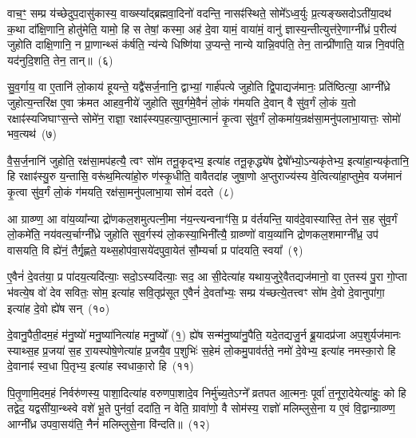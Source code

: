 वाच॒ꣳ॒ सम्प्र य॑च्छेदुप॒दासु॑कास्य॒ वाख्स्या᳚द्ब्रह्मवा॒दिनो॑ वदन्ति॒ नासꣴ॑स्थिते॒ सोमे᳚\-ऽध्व॒र्युः प्र॒त्यङ्ख्सदो\-ऽती॑या॒दथ॑ क॒था दा᳚क्षि॒णानि॒ होतु॑मेति॒ यामो॒ हि स तेषां॒ कस्मा॒ अह॑ दे॒वा यामं॒ वाया॑मं॒ वानु॑ ज्ञास्य॒न्तीत्युत्त॑रे॒णाग्नी᳚ध्रं प॒रीत्य॑ जुहोति दाक्षि॒णानि॒ न प्रा॒णान्थ्सं क॑र्\mbox{}षति॒ न्य॑न्ये धिष्णि॑या उ॒प्यन्ते॒ नान्ये यान्नि॒वप॑ति॒ तेन॒ तान्प्री॑णाति॒ यान्न नि॒वप॑ति॒ यद॑नुदि॒शति॒ तेन॒ तान्॥~(६)\ip

{\anuvakamend[{स्तु॒ते वि॒न्दते॒ हि वी॑यन्ते प्र॒तीची॑रुद्गा॒त्र उ॒प्यन्ते॒ चतु॑र्दश च}]}

सु॒व॒र्गाय॒ वा ए॒तानि॑ लो॒काय॑ हूयन्ते॒ यद्वै॑सर्ज॒नानि॒ द्वाभ्यां॒ गार्\mbox{}ह॑पत्ये जुहोति द्वि॒पाद्यज॑मानः॒ प्रति॑ष्ठित्या॒ आग्नी᳚ध्रे जुहोत्य॒न्तरि॑क्ष ए॒वा क्र॑मत आहव॒नीये॑ जुहोति सुव॒र्गमे॒वैनं॑ लो॒कं ग॑मयति दे॒वान् वै सु॑व॒र्गं लो॒कं य॒तो रक्षाꣴ॑स्यजिघाꣳस॒न्ते सोमे॑न॒ राज्ञा॒ रक्षाꣴ॑स्यप॒हत्या॒प्तुमा॒त्मानं॑ कृ॒त्वा सु॑व॒र्गं लो॒कमा॑य॒न्रक्ष॑सा॒मनु॑पलाभा॒यात्तः॒ सोमो॑ भव॒त्यथ॑~(७)\ip

वै॒स॒र्ज॒नानि॑ जुहोति॒ रक्ष॑सा॒मप॑हत्यै॒ त्वꣳ सो॑म तनू॒कृद्भ्य॒ इत्या॑ह तनू॒कृद्ध्ये॑ष द्वेषो᳚भ्यो॒\-ऽन्यकृ॑तेभ्य॒ इत्या॑हा॒न्यकृ॑तानि॒ हि रक्षाꣴ॑स्यु॒रु य॒न्तासि॒ वरू॑थ॒मित्या॑हो॒रु ण॑स्कृ॒धीति॒ वावैतदा॑ह जुषा॒णो अ॒प्तुराज्य॑स्य वे॒त्वित्या॑हा॒प्तुमे॒व यज॑मानं कृ॒त्वा सु॑व॒र्गं लो॒कं ग॑मयति॒ रक्ष॑सा॒मनु॑पलाभा॒या सोमं॑ ददते~(८)\ip

आ ग्राव्ण्ण॒ आ वा॑य॒व्या᳚न्या द्रो॑णकल॒शमुत्पत्नी॒मा न॑य॒न्त्यन्वनाꣳ॑सि॒ प्र व॑र्तयन्ति॒ याव॑दे॒वास्यास्ति॒ तेन॑ स॒ह सु॑व॒र्गं लो॒कमे॑ति॒ नय॑वत्य॒र्चाग्नी᳚ध्रे जुहोति सुव॒र्गस्य॑ लो॒कस्या॒भिनी᳚त्यै॒ ग्राव्ण्णो॑ वाय॒व्या॑नि द्रोणकल॒शमाग्नी᳚ध्र॒ उप॑ वासयति॒ वि ह्ये॑नं॒ तैर्गृ॒ह्णते॒ यथ्स॒होप॑वा॒सये॑दपुवा॒येत॑ सौ॒म्यर्चा प्र पा॑दयति॒ स्वया᳚~(९)\ip

ए॒वैनं॑ दे॒वत॑या॒ प्र पा॑दय॒त्यदि॑त्याः॒ सदो॒\-ऽस्यदि॑त्याः॒ सद॒ आ सी॒देत्या॑ह यथाय॒जुरे॒वैतद्यज॑मानो॒ वा ए॒तस्य॑ पु॒रा गो॒प्ता भ॑वत्ये॒ष वो॑ देव सवितः॒ सोम॒ इत्या॑ह सवि॒तृप्र॑सूत ए॒वैनं॑ दे॒वता᳚भ्यः॒ सम्प्र य॑च्छत्ये॒तत्त्वꣳ सो॑म दे॒वो दे॒वानुपा॑गा॒ इत्या॑ह दे॒वो ह्ये॑ष सन्~(१०)\ip

दे॒वानु॒पैती॒दम॒हं म॑नु॒ष्यो॑ मनु॒ष्या॑नित्या॑ह मनु॒ष्यो᳚ (१॒) ह्ये॑ष सन्म॑नु॒ष्या॑नु॒पैति॒ यदे॒तद्यजु॒र्न ब्रू॒यादप्र॑जा अप॒शुर्यज॑मानः स्याथ्स॒ह प्र॒जया॑ स॒ह रा॒यस्पोषे॒णेत्या॑ह प्र॒जयै॒व प॒शुभिः॑ स॒हेमं लो॒कमु॒पाव॑र्तते॒ नमो॑ दे॒वेभ्य॒ इत्या॑ह नमस्का॒रो हि दे॒वानाꣴ॑ स्व॒धा पि॒तृभ्य॒ इत्या॑ह स्वधाका॒रो हि~(११)\ip

पि॒तृ॒णामि॒दम॒हं निर्वरु॑णस्य॒ पाशा॒दित्या॑ह वरुणपा॒शादे॒व निर्मु॑च्य॒ते\-ऽग्ने᳚ व्रतपत आ॒त्मनः॒ पूर्वा॑ त॒नूरा॒देयेत्या॑हुः॒ को हि तद्वेद॒ यद्वसी॑या॒न्थ्स्वे वशे॑ भू॒ते पुन॑र्वा॒ ददा॑ति॒ न वेति॒ ग्रावा॑णो॒ वै सोम॑स्य॒ राज्ञो॑ मलिम्लुसे॒ना य ए॒वं वि॒द्वान्ग्राव्ण्ण॒ आग्नी᳚ध्र उपवा॒सय॑ति॒ नैनं॑ मलिम्लुसे॒ना वि॑न्दति॥~(१२)\ip

